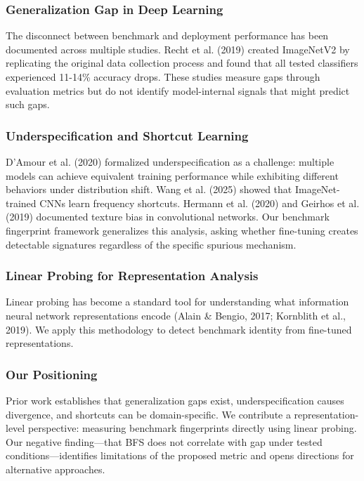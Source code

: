 
\subsubsection{Generalization Gap in Deep Learning}

The disconnect between benchmark and deployment performance has been documented across multiple studies. Recht et al. (2019) created ImageNetV2 by replicating the original data collection process and found that all tested classifiers experienced 11-14\% accuracy drops. These studies measure gaps through evaluation metrics but do not identify model-internal signals that might predict such gaps.

\subsubsection{Underspecification and Shortcut Learning}

D'Amour et al. (2020) formalized underspecification as a challenge: multiple models can achieve equivalent training performance while exhibiting different behaviors under distribution shift. Wang et al. (2025) showed that ImageNet-trained CNNs learn frequency shortcuts. Hermann et al. (2020) and Geirhos et al. (2019) documented texture bias in convolutional networks. Our benchmark fingerprint framework generalizes this analysis, asking whether fine-tuning creates detectable signatures regardless of the specific spurious mechanism.

\subsubsection{Linear Probing for Representation Analysis}

Linear probing has become a standard tool for understanding what information neural network representations encode (Alain \& Bengio, 2017; Kornblith et al., 2019). We apply this methodology to detect benchmark identity from fine-tuned representations.

\subsubsection{Our Positioning}

Prior work establishes that generalization gaps exist, underspecification causes divergence, and shortcuts can be domain-specific. We contribute a representation-level perspective: measuring benchmark fingerprints directly using linear probing. Our negative finding---that BFS does not correlate with gap under tested conditions---identifies limitations of the proposed metric and opens directions for alternative approaches.

